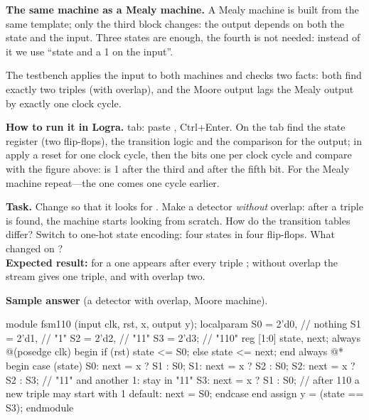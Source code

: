 \textbf{The same machine as a Mealy machine.} A Mealy machine is built from the
same template; only the third block changes: the output depends on both the state
and the input. Three states are enough, the fourth is not needed: instead of it
we use ``state  and a 1 on the input''.


The testbench  applies the input  to both
machines and checks two facts: both find exactly two triples  (with
overlap), and the Moore output lags the Mealy output by exactly one clock cycle.

\textbf{How to run it in Logra.}  tab: paste , Ctrl+Enter.
On the  tab find the state register (two flip-flops), the transition
logic and the comparison for the output; in  apply a reset for
one clock cycle, then the bits  one per clock cycle and
compare with the figure above:  is 1 after the third and after the fifth
bit. For the Mealy machine repeat---the one comes one cycle earlier.

\begin{diybox}
\textbf{Task.}  Change  so that it looks for .
 Make a detector \emph{without} overlap: after a triple is found, the
machine starts looking from scratch. How do the transition tables differ?
 Switch to one-hot state encoding: four states in four flip-flops. What
changed on ?\\
\textbf{Expected result:} for  a one appears after every triple
; without overlap the stream  gives one triple, and with
overlap two.
\end{diybox}

\textbf{Sample answer} (a  detector with overlap, Moore machine).
\begin{vcode}
module fsm110 (input clk, rst, x, output y);
    localparam S0 = 2'd0,    // nothing
               S1 = 2'd1,    // "1"
               S2 = 2'd2,    // "11"
               S3 = 2'd3;    // "110"
    reg [1:0] state, next;
    always @(posedge clk) begin
        if (rst) state <= S0;
        else     state <= next;
    end
    always @* begin
        case (state)
            S0:      next = x ? S1 : S0;
            S1:      next = x ? S2 : S0;
            S2:      next = x ? S2 : S3;   // "11" and another 1: stay in "11"
            S3:      next = x ? S1 : S0;   // after 110 a new triple may start with 1
            default: next = S0;
        endcase
    end
    assign y = (state == S3);
endmodule
\end{vcode}

